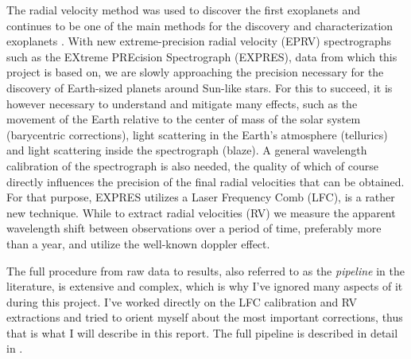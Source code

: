 
The radial velocity method was used to discover the first exoplanets and continues to be one of the main methods for the discovery and characterization exoplanets \cite{radial_velocity_techniques}. With new extreme-precision radial velocity (EPRV) spectrographs such as the EXtreme PREcision Spectrograph (EXPRES), data from which this project is based on, we are slowly approaching the precision necessary for the discovery of Earth-sized planets around Sun-like stars. For this to succeed, it is however necessary to understand and mitigate many effects, such as the movement of the Earth relative to the center of mass of the solar system (barycentric corrections), light scattering in the Earth's atmosphere (tellurics) and light scattering inside the spectrograph (blaze). 
A general wavelength calibration of the spectrograph is also needed, the quality of which of course directly influences the precision of the final radial velocities that can be obtained. For that purpose, EXPRES utilizes a Laser Frequency Comb (LFC), is a rather new technique. While to extract radial velocities (RV) we measure the apparent wavelength shift between observations over a period of time, preferably more than a year, and utilize the well-known doppler effect. 

The full procedure from raw data to results, also referred to as the \emph{pipeline} in the literature, is extensive and complex, which is why I've ignored many aspects of it during this project. I've worked directly on the LFC calibration and RV extractions and tried to orient myself about the most important corrections, thus that is what I will describe in this report. The full pipeline is described in detail in \cite{first_RV_from_EXPRES}. 